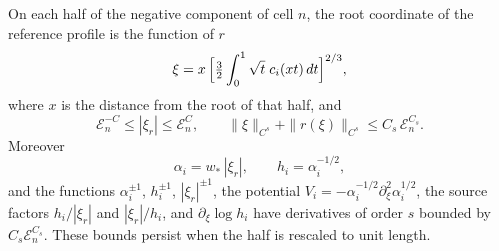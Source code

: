 \begin{lemma}
\label{lem:reference-regularized-charts}
\label{lem:reference-height-source-factors}
On each half of the negative component of cell $n$, the root
coordinate of the reference profile is the function of $r$
\begin{equation}\label{eq:geometry-regular-root-coordinate}
 \xi=x\,\Bigl[\tfrac32\int_0^1\sqrt t\;c_i(xt)\,dt\Bigr]^{2/3},
\end{equation}
where $x$ is the distance from the root of that half, and
\begin{equation}\label{eq:geometry-root-inverse}
 \mathcal E_n^{-C}\le|\xi_r|\le\mathcal E_n^{C},\qquad
 \|\xi\|_{C^s}+\|r(\xi)\|_{C^s}\le C_s\,\mathcal E_n^{C_s}.
\end{equation}
Moreover
\begin{equation}\label{eq:geometry-root-density}
 \alpha_i=w_*\,|\xi_r|,\qquad h_i=\alpha_i^{-1/2},
\end{equation}
and the functions $\alpha_i^{\pm1}$, $h_i^{\pm1}$, $|\xi_r|^{\pm1}$,
the potential $V_i=-\alpha_i^{-1/2}\partial_\xi^2\alpha_i^{1/2}$, the
source factors $h_i/|\xi_r|$ and $|\xi_r|/h_i$, and
$\partial_\xi\log h_i$ have derivatives of order $s$ bounded by
$C_s\mathcal E_n^{C_s}$. These bounds persist when the half is
rescaled to unit length.
\end{lemma}

